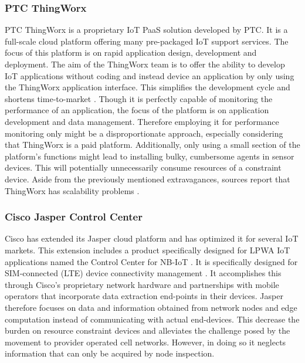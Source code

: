 \subsubsection*{PTC ThingWorx}
PTC ThingWorx \cite{web:thingworx} is a proprietary IoT PaaS solution developed by PTC. It is a full-scale cloud platform offering many pre-packaged IoT support services. The focus of this platform is on rapid application design, development and deployment. The aim of the ThingWorx team is to offer the ability to develop IoT applications without coding and instead device an application by only using the ThingWorx application interface. This simplifies the development cycle and shortens time-to-market \cite{study_of_various}. Though it is perfectly capable of monitoring the performance of an application, the focus of the platform is on application development and data management. Therefore employing it for performance monitoring only might be a disproportionate approach, especially considering that ThingWorx is a paid platform. Additionally, only using a small section of the platform's functions might lead to installing bulky, cumbersome agents in sensor devices. This will potentially unnecessarily consume resources of a constraint device. Aside from the previously mentioned extravagances, sources report that ThingWorx has scalability problems \cite{good_assessment}.%

\subsubsection*{Cisco Jasper Control Center}
Cisco has extended its Jasper cloud platform and has optimized it for several IoT markets. This extension includes a product specifically designed for LPWA IoT applications named the Control Center for NB-IoT \cite{cisco_jasper}. It is specifically designed for SIM-connected (LTE) device connectivity management \cite{forrester}. It accomplishes this through Cisco's proprietary network hardware and partnerships with mobile operators that incorporate data extraction end-points in their devices. Jasper therefore focuses on data and information obtained from network nodes and edge computation instead of communicating with actual end-devices. This decrease the burden on resource constraint devices and alleviates the challenge posed by the movement to provider operated cell networks. However, in doing so it neglects information that can only be acquired by node inspection. 

